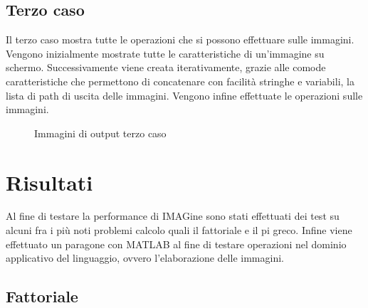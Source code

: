 \documentclass[10pt]{article}
\begin{document}
\clearpage
\subsection{Terzo caso}
Il terzo caso mostra tutte le operazioni che si possono effettuare sulle immagini. Vengono inizialmente mostrate tutte le caratteristiche di un'immagine su schermo. Successivamente viene creata iterativamente, grazie alle comode caratteristiche che permettono di concatenare con facilità stringhe e variabili, la lista di path di uscita delle immagini. Vengono infine effettuate le operazioni sulle immagini.



\begin{figure}[H]
	\centering
	\caption{Immagini di output terzo caso}
	\label{fig:case3out.png}
\end{figure}

\clearpage
\section{Risultati}
Al fine di testare la performance di IMAGine sono stati effettuati dei test su alcuni fra i più noti problemi calcolo quali il fattoriale e il pi greco. Infine viene effettuato un paragone con MATLAB al fine di testare operazioni nel dominio applicativo del linguaggio, ovvero l'elaborazione delle immagini.

\subsection{Fattoriale}
\end{document}
